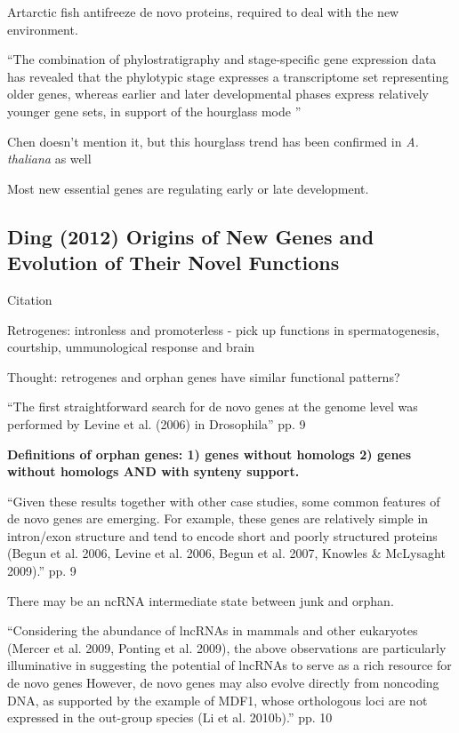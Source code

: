     Artarctic fish antifreeze de novo proteins, required to deal with the
    new environment.

    ``The combination of phylostratigraphy and stage-specific gene
    expression data has revealed that the phylotypic stage expresses a
    transcriptome set representing older genes, whereas earlier and later
    developmental phases express relatively younger gene sets, in support
    of the hourglass mode \cite{kalinka_gene_2010,
    domazet-loso_phylogenetically_2010}''

    Chen doesn't mention it, but this hourglass trend has been confirmed in
    \textit{A. thaliana} as well \cite{quint_transcriptomic_2012}

    Most new essential genes are regulating early or late development.

\subsection{Ding (2012) Origins of New Genes and Evolution of Their Novel
Functions}

    Citation \cite{ding_origins_2012}
    
    Retrogenes: intronless and promoterless - pick up functions in
    spermatogenesis, courtship, ummunological response and brain

    Thought: retrogenes and orphan genes have similar functional patterns?

    ``The first straightforward search for de novo genes at the genome
    level was performed by Levine et al. (2006) in Drosophila'' pp. 9

    \textbf{Definitions of orphan genes: 1) genes without homologs 2) genes
    without homologs AND with synteny support.}

    ``Given these results together with other case studies, some common
    features of de novo genes are emerging. For example, these genes are
    relatively simple in intron/exon structure and tend to encode short and
    poorly structured proteins (Begun et al. 2006, Levine et al. 2006,
    Begun et al. 2007, Knowles \& McLysaght 2009).'' pp. 9

    There may be an ncRNA intermediate state between junk and orphan.

    ``Considering the abundance of lncRNAs in mammals and other eukaryotes
    (Mercer et al. 2009, Ponting et al. 2009), the above observations are
    particularly illuminative in suggesting the potential of lncRNAs to
    serve as a rich resource for de novo genes However, de novo genes may
    also evolve directly from noncoding DNA, as supported by the example of
    MDF1, whose orthologous loci are not expressed in the out-group species
    (Li et al. 2010b).'' pp. 10


